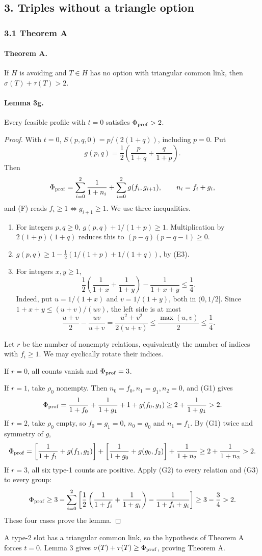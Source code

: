 \subsection*{3. Triples without a triangle option}
\subsubsection*{3.1 Theorem A}
\paragraph{Theorem A.} If $H$ is avoiding and $T\in H$ has no option with triangular common link, then $\sigma(T)+\tau(T)>2$.

\paragraph{Lemma 3g.} Every feasible profile with $t=0$ satisfies $\Phi_{\rm prof}>2$.
\begin{proof}
With $t=0$, $S(p,q,0)=p/(2(1+q))$, including $p=0$. Put
\[
 g(p,q)=\frac12\left(\frac p{1+q}+\frac q{1+p}\right).
\]
Then
\[
 \Phi_{\rm prof}=\sum_{i=0}^2\frac1{1+n_i}
       +\sum_{i=0}^2g(f_i,g_{i+1}),\qquad n_i=f_i+g_i,
\]
and (F) reads $f_i\geq1\iff g_{i+1}\geq1$. We use three inequalities.
\begin{enumerate}
\item[(G1)] For integers $p,q\geq0$, $g(p,q)+1/(1+p)\geq1$. Multiplication by $2(1+p)(1+q)$ reduces this to $(p-q)(p-q-1)\geq0$.
\item[(G2)] $g(p,q)\geq1-\tfrac12(1/(1+p)+1/(1+q))$, by (E3).
\item[(G3)] For integers $x,y\geq1$,
\[
 \frac12\left(\frac1{1+x}+\frac1{1+y}\right)-\frac1{1+x+y}\leq\frac14.
\]
Indeed, put $u=1/(1+x)$ and $v=1/(1+y)$, both in $(0,1/2]$. Since $1+x+y\leq(u+v)/(uv)$, the left side is at most
\[
 \frac{u+v}{2}-\frac{uv}{u+v}
 =\frac{u^2+v^2}{2(u+v)}\leq\frac{\max(u,v)}2\leq\frac14.
\]
\end{enumerate}
Let $r$ be the number of nonempty relations, equivalently the number of indices with $f_i\geq1$. We may cyclically rotate their indices.

If $r=0$, all counts vanish and $\Phi_{\rm prof}=3$.

If $r=1$, take $\rho_0$ nonempty. Then $n_0=f_0,n_1=g_1,n_2=0$, and (G1) gives
\[
 \Phi_{\rm prof}=\frac1{1+f_0}+\frac1{1+g_1}+1+g(f_0,g_1)
 \geq2+\frac1{1+g_1}>2.
\]
If $r=2$, take $\rho_0$ empty, so $f_0=g_1=0$, $n_0=g_0$ and $n_1=f_1$. By (G1) twice and symmetry of $g$,
\[
 \Phi_{\rm prof}=\left[\frac1{1+f_1}+g(f_1,g_2)\right]
 +\left[\frac1{1+g_0}+g(g_0,f_2)\right]+\frac1{1+n_2}
 \geq2+\frac1{1+n_2}>2.
\]
If $r=3$, all six type-1 counts are positive. Apply (G2) to every relation and (G3) to every group:
\[
 \Phi_{\rm prof}\geq3-\sum_{i=0}^2\left[
 \frac12\left(\frac1{1+f_i}+\frac1{1+g_i}\right)-\frac1{1+f_i+g_i}\right]
 \geq3-\frac34>2.
\]
These four cases prove the lemma.
\end{proof}
A type-2 slot has a triangular common link, so the hypothesis of Theorem A forces $t=0$. Lemma 3 gives $\sigma(T)+\tau(T)\geq\Phi_{\rm prof}$, proving Theorem A.
